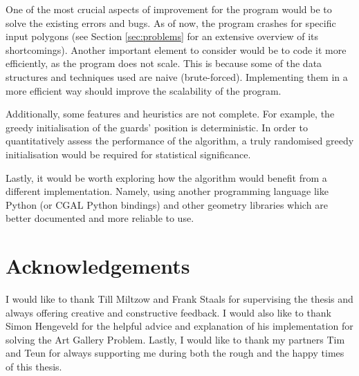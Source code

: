 One of the most crucial aspects of improvement for the program would be to solve the existing errors and bugs. As of now, the program crashes for specific input polygons (see Section \ref{sec:problems} for an extensive overview of its shortcomings). Another important element to consider would be to code it more efficiently, as the program does not scale. This is because some of the data structures and techniques used are naive (brute-forced). Implementing them in a more efficient way should improve the scalability of the program.

Additionally, some features and heuristics are not complete. For example, the greedy initialisation of the guards' position is deterministic. In order to quantitatively assess the performance of the algorithm, a truly randomised greedy initialisation would be required for statistical significance.

Lastly, it would be worth exploring how the algorithm would benefit from a different implementation. Namely, using another programming language like Python (or CGAL Python bindings) and other geometry libraries which are better documented and more reliable to use.


\newpage
\thispagestyle{empty}
\section*{Acknowledgements}
I would like to thank Till Miltzow and Frank Staals for supervising the thesis and always offering creative and constructive feedback. I would also like to thank Simon Hengeveld for the helpful advice and explanation of his implementation for solving the Art Gallery Problem.
Lastly, I would like to thank my partners Tim and Teun for always supporting me during both the rough and the happy times of this thesis.